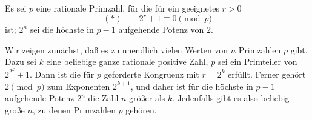 
Es sei $p$ eine rationale Primzahl, für die für ein geeignetes $r>0$
\[
        (*)\qquad 2^r+1\equiv0\pmod p
\]
ist; $2^n$ sei die höchste in $p-1$ aufgehende Potenz von $2$.

Wir zeigen zunächst, daß es zu unendlich vielen Werten von $n$ Primzahlen $p$ gibt. Dazu sei $k$ eine beliebige ganze rationale positive Zahl, $p$ sei ein Primteiler von $2^{2^k}+1$. Dann ist die für $p$ geforderte Kongruenz mit $r=2^k$ erfüllt. Ferner gehört $2\pmod p$ zum Exponenten $2^{k+1}$, und daher ist für die höchste in $p-1$ aufgehende Potenz $2^n$ die Zahl $n$ größer als $k$. Jedenfalls gibt es also beliebig große $n$, zu denen Primzahlen $p$ gehören.
